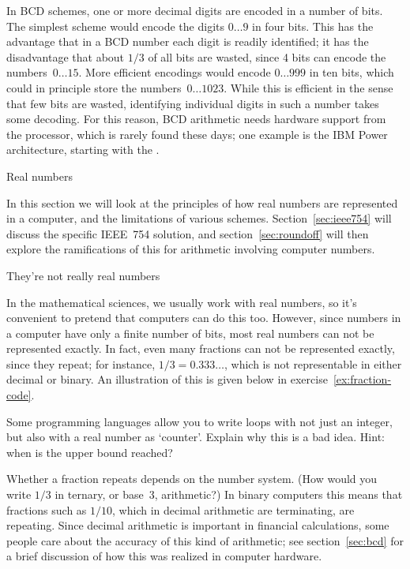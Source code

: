 In BCD schemes, one or more decimal digits are encoded in a number of
bits. The simplest scheme would encode the digits $0\ldots9$ in four
bits. This has the advantage that in a
BCD number each digit is readily identified; it has the disadvantage
that about $1/3$ of all bits are wasted, since 4 bits can
encode the numbers~$0\ldots15$.
%
More efficient encodings would encode $0\ldots999$ in ten bits, which
could in principle store the numbers~$0\ldots1023$. While this is
efficient in the sense that few bits are wasted, identifying
individual digits in such a number takes some decoding. For this
reason, BCD arithmetic needs hardware support from the processor,
which is rarely found these days; one example is the IBM
Power architecture, starting with the .

 {Real numbers}

In this section we will look at the principles of how real numbers are
represented in a computer, and the limitations of various schemes.
Section~\ref{sec:ieee754} will discuss the specific IEEE~754
solution, and
section~\ref{sec:roundoff} will then explore the ramifications of this for arithmetic
involving computer numbers.

 {They're not really real numbers}
\label{sec:arith-intro}

In the mathematical sciences, we usually work with real numbers, so
it's convenient to pretend that computers can do this too. However,
since numbers in a computer have only a finite number of bits, most
real numbers can not be represented exactly. In fact, even many
fractions can not be represented exactly, since they repeat; for
instance, $1/3=0.333\ldots$, which is not representable in either
decimal or binary. An illustration of this is given below
in exercise~\ref{ex:fraction-code}.

\begin{exercise}
  Some programming languages allow you to write loops with not just an
  integer, but also with a real number as `counter'. Explain why this
  is a bad idea. Hint: when is the upper bound reached?
\end{exercise}

Whether a fraction repeats depends on the number system. (How would
you write $1/3$ in ternary, or base~3, arithmetic?) In binary computers
this means that fractions such as $1/10$, which in decimal arithmetic
are terminating, are repeating. Since decimal arithmetic is important
in financial calculations, some
people care about the accuracy of this kind of arithmetic;
see section~\ref{sec:bcd} for a brief discussion
of how this was realized in computer hardware.

